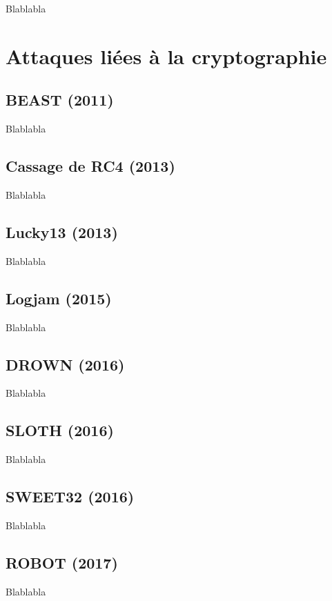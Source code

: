 Blablabla \cite{berserk}

\section{Attaques liées à la cryptographie}

\subsection{BEAST (2011)}

Blablabla \cite{beast}

\subsection{Cassage de RC4 (2013)}

Blablabla \cite{rc4}

\subsection{Lucky13 (2013)}

Blablabla \cite{lucky13}

\subsection{Logjam (2015)}

Blablabla \cite{logjam}

\subsection{DROWN (2016)}

Blablabla \cite{drown}

\subsection{SLOTH (2016)}

Blablabla \cite{sloth}

\subsection{SWEET32 (2016)}

Blablabla \cite{sweet32}

\subsection{ROBOT (2017)}

Blablabla \cite{robot}

